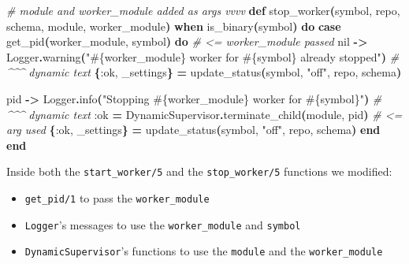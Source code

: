 \documentclass[
  oneside]{book}
\newenvironment{Shaded}{\begin{snugshade}}{\end{snugshade}}
\newcommand{\CommentTok}[1]{\textcolor[rgb]{0.56,0.35,0.01}{\textit{#1}}}
\newcommand{\ConstantTok}[1]{\textcolor[rgb]{0.56,0.35,0.01}{#1}}
\newcommand{\FunctionTok}[1]{\textcolor[rgb]{0.13,0.29,0.53}{\textbf{#1}}}
\newcommand{\KeywordTok}[1]{\textcolor[rgb]{0.13,0.29,0.53}{\textbf{#1}}}
\newcommand{\NormalTok}[1]{#1}
\newcommand{\OperatorTok}[1]{\textcolor[rgb]{0.81,0.36,0.00}{\textbf{#1}}}
\newcommand{\OtherTok}[1]{\textcolor[rgb]{0.56,0.35,0.01}{#1}}
\newcommand{\StringTok}[1]{\textcolor[rgb]{0.31,0.60,0.02}{#1}}
\newcommand{\VariableTok}[1]{\textcolor[rgb]{0.00,0.00,0.00}{#1}}
\providecommand{\tightlist}{%
  \setlength{\itemsep}{0pt}\setlength{\parskip}{0pt}}
\begin{document}
\begin{Shaded}
\begin{Highlighting}[]
  \CommentTok{\# module and worker\_module added as args vvvv}
  \KeywordTok{def}\NormalTok{ stop\_worker}\FunctionTok{(}\NormalTok{symbol, repo, schema, module, worker\_module}\FunctionTok{)}
      \KeywordTok{when}\NormalTok{ is\_binary}\FunctionTok{(}\NormalTok{symbol}\FunctionTok{)} \KeywordTok{do}
    \KeywordTok{case}\NormalTok{ get\_pid}\FunctionTok{(}\NormalTok{worker\_module, symbol}\FunctionTok{)} \KeywordTok{do} \CommentTok{\# \textless{}= worker\_module passed}
      \ConstantTok{nil} \OperatorTok{{-}\textgreater{}}
        \ConstantTok{Logger}\OperatorTok{.}\NormalTok{warning}\FunctionTok{(}\StringTok{"}\OtherTok{\#\{}\NormalTok{worker\_module}\OtherTok{\}}\StringTok{ worker for }\OtherTok{\#\{}\NormalTok{symbol}\OtherTok{\}}\StringTok{ already stopped"}\FunctionTok{)}
                             \CommentTok{\# \^{}\^{}\^{} dynamic text}
        \FunctionTok{\{}\VariableTok{:ok}\NormalTok{, \_settings}\FunctionTok{\}} \OperatorTok{=}\NormalTok{ update\_status}\FunctionTok{(}\NormalTok{symbol, }\StringTok{"off"}\NormalTok{, repo, schema}\FunctionTok{)}

\NormalTok{      pid }\OperatorTok{{-}\textgreater{}}
        \ConstantTok{Logger}\OperatorTok{.}\NormalTok{info}\FunctionTok{(}\StringTok{"Stopping }\OtherTok{\#\{}\NormalTok{worker\_module}\OtherTok{\}}\StringTok{ worker for }\OtherTok{\#\{}\NormalTok{symbol}\OtherTok{\}}\StringTok{"}\FunctionTok{)}
                             \CommentTok{\# \^{}\^{}\^{} dynamic text}
        \VariableTok{:ok} \OperatorTok{=} \ConstantTok{DynamicSupervisor}\OperatorTok{.}\NormalTok{terminate\_child}\FunctionTok{(}\NormalTok{module, pid}\FunctionTok{)} \CommentTok{\# \textless{}= arg used}
        \FunctionTok{\{}\VariableTok{:ok}\NormalTok{, \_settings}\FunctionTok{\}} \OperatorTok{=}\NormalTok{ update\_status}\FunctionTok{(}\NormalTok{symbol, }\StringTok{"off"}\NormalTok{, repo, schema}\FunctionTok{)}
    \KeywordTok{end}
  \KeywordTok{end}
\end{Highlighting}
\end{Shaded}

Inside both the \texttt{start\_worker/5} and the \texttt{stop\_worker/5} functions we modified:

\begin{itemize}
\tightlist
\item
  \texttt{get\_pid/1} to pass the \texttt{worker\_module}
\item
  \texttt{Logger}'s messages to use the \texttt{worker\_module} and \texttt{symbol}
\item
  \texttt{DynamicSupervisor}'s functions to use the \texttt{module} and the \texttt{worker\_module}
\end{itemize}
\end{document}
